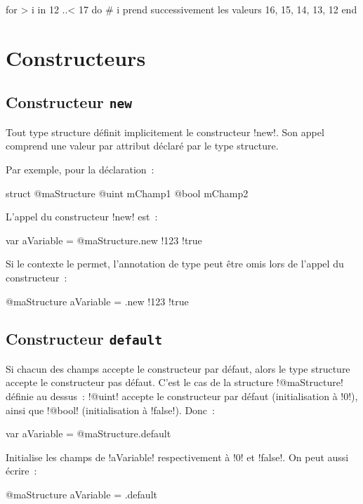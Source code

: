 \begin{galgas}
for > i in 12 ..< 17 do
  # i prend successivement les valeurs 16, 15, 14, 13, 12
end
\end{galgas}
 


\section{Constructeurs}

\subsection{Constructeur \texttt{new}}

Tout type structure définit implicitement le constructeur \ggs!new!. Son appel comprend une valeur par attribut déclaré par le type structure.

Par exemple, pour la déclaration~:
\begin{galgas}
struct @maStructure
  @uint mChamp1
  @bool mChamp2
\end{galgas}

L'appel du constructeur \ggs!new! est~:
\begin{galgas}
var aVariable = @maStructure.new {!123 !true}
\end{galgas}

Si le contexte le permet, l'annotation de type peut être omis lors de l'appel du constructeur~:
\begin{galgas}
@maStructure aVariable = .new {!123 !true}
\end{galgas}


\subsection{Constructeur \texttt{default}}

Si chacun des champs accepte le constructeur par défaut, alors le type structure accepte le constructeur pas défaut. C'est le cas de la structure \ggs!@maStructure! définie au dessus~: \ggs!@uint! accepte le constructeur par défaut (initialisation à \ggs!0!), ainsi que \ggs!@bool! (initialisation à \ggs!false!). Donc~:
\begin{galgas}
var aVariable = @maStructure.default
\end{galgas}
Initialise les champs de \ggs!aVariable! respectivement à \ggs!0! et \ggs!false!. On peut aussi écrire~:
\begin{galgas}
@maStructure aVariable = .default
\end{galgas}


